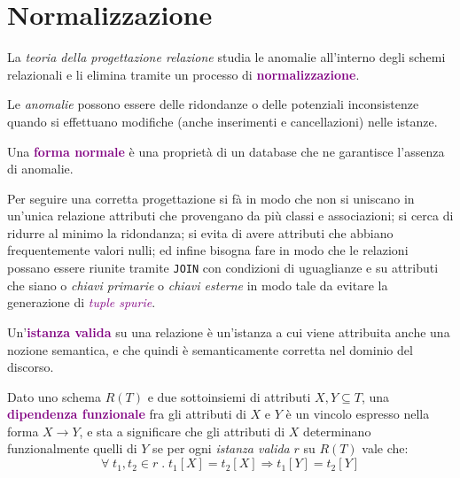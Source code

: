 \newpage

\section{Normalizzazione}

La \emph{teoria della progettazione relazione} studia le anomalie all'interno
degli schemi relazionali e li elimina tramite un processo di \textbf{\textcolor{purple}{normalizzazione}}.

Le \emph{anomalie} possono essere delle ridondanze o delle potenziali
inconsistenze quando si effettuano modifiche (anche inserimenti e cancellazioni) nelle istanze.

\begin{definition}
    Una \textbf{\textcolor{purple}{forma normale}} è una proprietà di un
    database che ne garantisce l'assenza di anomalie.
\end{definition}

Per seguire una corretta progettazione si fà in modo che non si uniscano in un'unica
relazione attributi che provengano da più classi e associazioni; si cerca di ridurre
al minimo la ridondanza; si evita di avere attributi che abbiano frequentemente
valori nulli; ed infine bisogna fare in modo che le relazioni possano essere riunite
tramite \verb|JOIN| con condizioni di uguaglianze e su attributi che siano o \emph{chiavi primarie}
o \emph{chiavi esterne} in modo tale da evitare la generazione di \emph{\textcolor{purple}{tuple spurie}}.

\begin{definition}
    Un'\textbf{\textcolor{purple}{istanza valida}} su una relazione è un'istanza a cui
    viene attribuita anche una nozione semantica, e che quindi è semanticamente corretta
    nel dominio del discorso.
\end{definition}

\begin{definition}
    Dato uno schema $R(T)$ e due sottoinsiemi di attributi $X, Y \subseteq T$, una \textbf{\textcolor{purple}{dipendenza funzionale}}
    fra gli attributi di $X$ e $Y$ è un vincolo espresso nella forma $X \rightarrow Y$, e sta a significare
    che gli attributi di $X$ determinano funzionalmente quelli di $Y$ se per ogni \emph{istanza valida} $r$ su $R(T)$ vale che:
    \begin{equation*}
        \forall \; t_1, t_2 \in r\;.\;t_1[X] = t_2[X] \Rightarrow t_1[Y] = t_2[Y]
    \end{equation*}
\end{definition}


